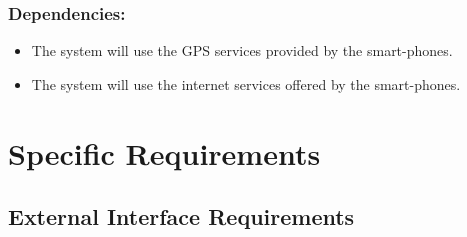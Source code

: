 \documentclass[titlepage]{article}
\begin{document}
\subsubsection{Dependencies: }
\begin{itemize}
	\item The system will use the GPS services provided by the smart-phones.
	\item The system will use the internet services offered by the smart-phones.\\
\end{itemize}



\section{Specific Requirements}
\subsection{External Interface Requirements}
\end{document}
